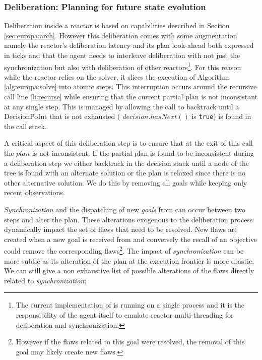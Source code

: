 
\subsubsection{Deliberation: Planning for future state evolution}
\label{sec:arch:plan}

Deliberation inside a reactor is based on \eu capabilities described
in Section \ref{sec:europa:arch}. However this deliberation comes with
some augmentation namely the reactor's deliberation latency and its
plan look-ahead both expressed in ticks and that the agent needs to
interleave deliberation with not just the synchronization but also
with deliberation of other reactors\footnote{The current
  implementation of \rx is running on a single process and it is the
  responsibility of the agent itself to emulate reactor
  multi-threading for deliberation and synchronization.}.  For this
reason while the reactor relies on the \eu solver, it slices the
execution of Algorithm \ref{alg:europa:solve} into atomic steps. This
interruption occurs around the recursive call line \ref{li:recurse}
while ensuring that the current partial plan is not inconsistant at
any single step. This is managed by allowing the call to backtrack
until a \textsf{DecisionPoInt} that is not exhausted (\ie
$decision.hasNext()$ is \texttt{true}) is found in the call stack.

A critical aspect of this deliberation step is to ensure that at the
exit of this call the $plan$ is not inconsistent. %
If the partial plan is found to be inconsistent during a deliberation
step we either backtrack in the decision stack until a node of the
tree is found with an alternate solution or the plan is relaxed since
there is no other alternative solution. We do this by removing all
goals while keeping only recent observations. 

{\em Synchronization} and the dispatching of new {\em goals} from \rx
can occur between two steps and alter the plan. These alterations
exogenous to the deliberation process dynamically impact the set of
flaws that need to be resolved. New flaws are created when a new goal
is received from \rx and conversely the recall of an objective could
remove the corresponding flaws\footnote{However if the flaws related
  to this goal were resolved, the removal of this goal may likely
  create new flaws.}. The impact of {\em synchronization} can be more
subtle as its alteration of the plan at the execution frontier is more
drastic. We can still give a non exhaustive list of possible
alterations of the flaws directly related to {\em synchronization}:

